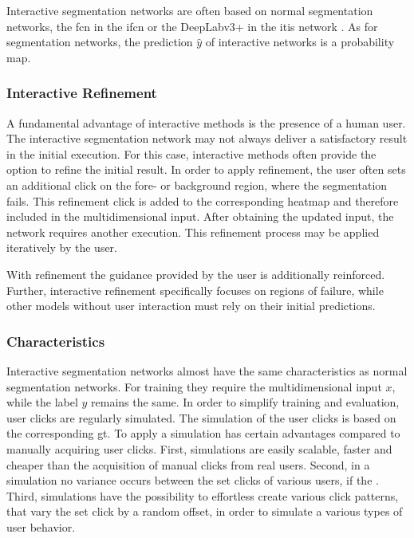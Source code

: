 Interactive segmentation networks are often based on normal segmentation networks, \eg the \gls{fcn} in the \gls{ifcn} \cite{Xu16-InteractiveObjectSelection} or the DeepLabv3+ in the \gls{itis} network \cite{MVL18-ITIS}.
As for segmentation networks, the prediction $\hat{y}$ of interactive networks is a probability map.

\subsubsection{Interactive Refinement}
A fundamental advantage of interactive methods is the presence of a human user.
The interactive segmentation network may not always deliver a satisfactory result in the initial execution.
For this case, interactive methods often provide the option to refine the initial result.
In order to apply refinement, the user often sets an additional click on the fore- or background region, where the segmentation fails.
This refinement click is added to the corresponding heatmap and therefore included in the multidimensional input.
After obtaining the updated input, the network requires another execution.
This refinement process may be applied iteratively by the user.

With refinement the guidance provided by the user is additionally reinforced.
Further, interactive refinement specifically focuses on regions of failure, while other models without user interaction must rely on their initial predictions.



\subsubsection{Characteristics}
Interactive segmentation networks almost have the same characteristics as normal segmentation networks.
For training they require the multidimensional input $x$, while the label $y$ remains the same.
In order to simplify training and evaluation, user clicks are regularly simulated.
The simulation of the user clicks is based on the corresponding \gls{gt}.
To apply a simulation has certain advantages compared to manually acquiring user clicks.
First, simulations are easily scalable, faster and cheaper than the acquisition of manual clicks from real users.
Second, in a simulation no variance occurs between the set clicks of various users, if the .
Third, simulations have the possibility to effortless create various click patterns, that \eg vary the set click by a random offset, in order to simulate a various types of user behavior.

